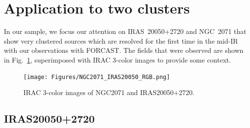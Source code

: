 \section{Application to two clusters}

In our sample, we focus our attention on IRAS~20050+2720 and NGC~2071 that show very clustered sources which are resolved for the first time in the mid-IR with our observations with FORCAST. The fields that were observed are shown in Fig.~\ref{fig:NGC2071_IRAS20050_RGB}, superimposed with IRAC 3-color images to provide some context.

\begin{landscape}
\begin{figure}
\begin{center}
\texttt{[image: Figures/NGC2071\_IRAS20050\_RGB.png]}
\label{fig:NGC2071_IRAS20050_RGB}
\caption[NGC2071 and IRAS20050+2720]{IRAC 3-color images of NGC2071 and IRAS20050+2720. 
}
\end{center}
\end{figure}
\end{landscape}




\subsection{IRAS20050+2720}

